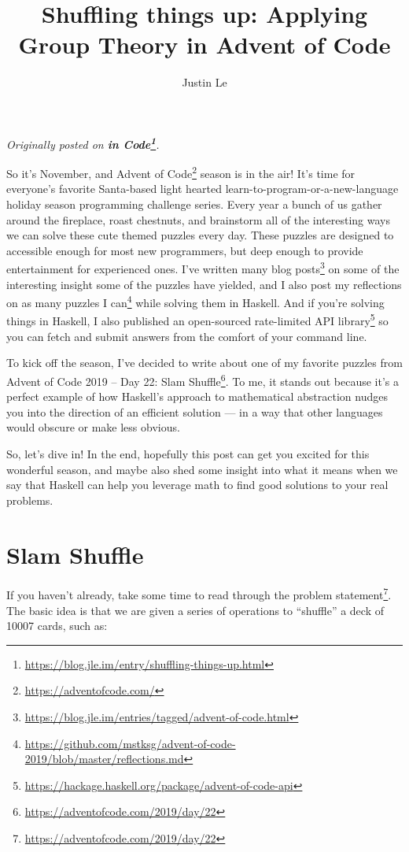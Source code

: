 \documentclass[]{article}
\title{Shuffling things up: Applying Group Theory in Advent of Code}
\author{Justin Le}
\renewcommand{\href}[2]{#2\footnote{\url{#1}}}
\begin{document}
\maketitle

\emph{Originally posted on
\textbf{\href{https://blog.jle.im/entry/shuffling-things-up.html}{in Code}}.}

So it's November, and \href{https://adventofcode.com/}{Advent of Code} season is
in the air! It's time for everyone's favorite Santa-based light hearted
learn-to-program-or-a-new-language holiday season programming challenge series.
Every year a bunch of us gather around the fireplace, roast chestnuts, and
brainstorm all of the interesting ways we can solve these cute themed puzzles
every day. These puzzles are designed to accessible enough for most new
programmers, but deep enough to provide entertainment for experienced ones. I've
\href{https://blog.jle.im/entries/tagged/advent-of-code.html}{written many blog
posts} on some of the interesting insight some of the puzzles have yielded, and
I also
\href{https://github.com/mstksg/advent-of-code-2019/blob/master/reflections.md}{post
my reflections on as many puzzles I can} while solving them in Haskell. And if
you're solving things in Haskell, I also published an
\href{https://hackage.haskell.org/package/advent-of-code-api}{open-sourced
rate-limited API library} so you can fetch and submit answers from the comfort
of your command line.

To kick off the season, I've decided to write about one of my favorite puzzles
from Advent of Code 2019 -- \href{https://adventofcode.com/2019/day/22}{Day 22:
Slam Shuffle}. To me, it stands out because it's a perfect example of how
Haskell's approach to mathematical abstraction nudges you into the direction of
an efficient solution --- in a way that other languages would obscure or make
less obvious.

So, let's dive in! In the end, hopefully this post can get you excited for this
wonderful season, and maybe also shed some insight into what it means when we
say that Haskell can help you leverage math to find good solutions to your real
problems.

\hypertarget{slam-shuffle}{%
\section{Slam Shuffle}\label{slam-shuffle}}

If you haven't already, take some time to
\href{https://adventofcode.com/2019/day/22}{read through the problem statement}.
The basic idea is that we are given a series of operations to ``shuffle'' a deck
of 10007 cards, such as:
\end{document}
